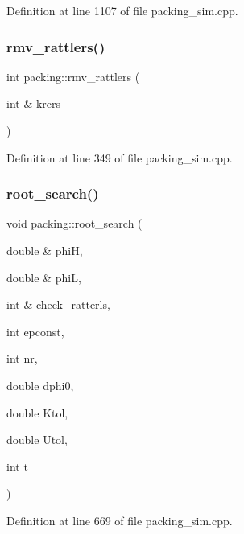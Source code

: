 Definition at line 1107 of file packing\+\_\+sim.\+cpp.

\mbox{\label{classpacking_a6c94dc46459e4acd96bc99d43ed257b2}} 
\subsubsection{\texorpdfstring{rmv\+\_\+rattlers()}{rmv\_rattlers()}}
{\footnotesize\ttfamily int packing\+::rmv\+\_\+rattlers (\begin{DoxyParamCaption}\item[{int \&}]{krcrs }\end{DoxyParamCaption})}



Definition at line 349 of file packing\+\_\+sim.\+cpp.

\mbox{\label{classpacking_a7560d84cdb496db31c6314c3a82b10e0}} 
\subsubsection{\texorpdfstring{root\+\_\+search()}{root\_search()}}
{\footnotesize\ttfamily void packing\+::root\+\_\+search (\begin{DoxyParamCaption}\item[{double \&}]{phiH,  }\item[{double \&}]{phiL,  }\item[{int \&}]{check\+\_\+ratterls,  }\item[{int}]{epconst,  }\item[{int}]{nr,  }\item[{double}]{dphi0,  }\item[{double}]{Ktol,  }\item[{double}]{Utol,  }\item[{int}]{t }\end{DoxyParamCaption})}



Definition at line 669 of file packing\+\_\+sim.\+cpp.

\mbox{\label{classpacking_a16f87413335e58b0ac9a9ded8742f32b}} 
